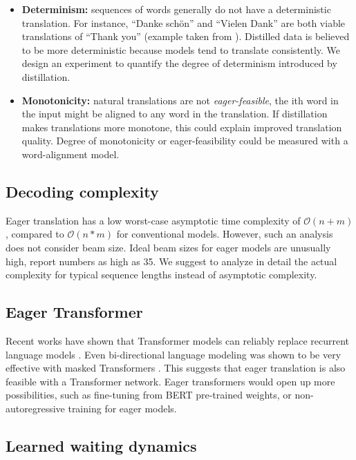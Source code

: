\documentclass[english]{uzhpub}
\begin{document}
\begin{itemize}
    \item \textbf{Determinism:} sequences of words generally do not have a deterministic translation. For instance, ``Danke schön'' and ``Vielen Dank'' are both viable translations of ``Thank you'' (example taken from \cite{gu2017non}). Distilled data is believed to be more deterministic because models tend to translate consistently. We design an experiment to quantify the degree of determinism introduced by distillation.
    \item \textbf{Monotonicity:} natural translations are not \textit{eager-feasible}, the ith word in the input might be aligned to any word in the translation. If distillation makes translations more monotone, this could explain improved translation quality. Degree of monotonicity or eager-feasibility could be measured with a word-alignment model.
\end{itemize}

\subsection{Decoding complexity}

Eager translation has a low worst-case asymptotic time complexity of $\mathcal{O}(n+m)$, compared to $\mathcal{O}(n*m)$ for conventional models. However, such an analysis does not consider beam size. Ideal beam sizes for eager models are unusually high, \cite{youmaynotneedattention} report numbers as high as 35. We suggest to analyze in detail the actual complexity for typical sequence lengths instead of asymptotic complexity.

\subsection{Eager Transformer}

Recent works have shown that Transformer models can reliably replace recurrent language models \cite{radford2019language}. Even bi-directional language modeling was shown to be very effective with masked Transformers \cite{devlin-etal-2019-bert}. This suggests that eager translation is also feasible with a Transformer network. Eager transformers would open up more possibilities, such as fine-tuning from BERT pre-trained weights, or non-autoregressive training for eager models.


\subsection{Learned waiting dynamics}
\end{document}
